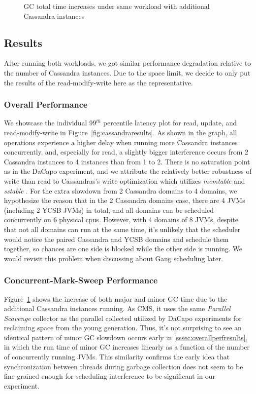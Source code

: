 \documentclass{sig-alternate}
\begin{document}
\begin{figure}
\centering
{}
\caption{GC total time increases under same workload with additional Cassandra instances}
\label{fig:cassandragc}
\end{figure}

\subsection{Results}
After running both workloads, we got similar performance degradation relative to the number of Cassandra instances. Due to the space limit, we decide to only put the results of the read-modify-write here as the representative.

\subsubsection{Overall Performance}
We showcase the individual 99$^{th}$ percentile latency plot for read, update, and read-modify-write in Figure~\ref{fig:cassandraresults}. As shown in the graph, all operations experience a higher delay when running more Cassandra instances concurrently, and, especially for read, a slightly bigger interference occurs from 2 Cassandra instances to 4 instances than from 1 to 2. There is no saturation point as in the DaCapo experiment, and we attribute the relatively better robustness of write than read to Cassandras's write optimization which utilizes \textit{memtable} and \textit{sstable} \cite{lakshman2010cassandra}. For the extra slowdown from 2 Cassandra domains to 4 domains, we hypothesize the reason that in the 2 Cassandra domains case, there are 4 JVMs (including 2 YCSB JVMs) in total, and all domains can be scheduled concurrently on 6 physical cpus. However, with 4 domains of 8 JVMs, despite that not all domains can run at the same time, it's unlikely that the scheduler would notice the paired Cassandra and YCSB domains and schedule them together, so chances are one side is blocked while the other side is running. We would revisit this problem when discussing about Gang scheduling later.

\subsubsection{Concurrent-Mark-Sweep Performance}
Figure~\ref{fig:cassandragc} shows the increase of both major and minor GC time due to the additional Cassandra instances running. As CMS, it uses the same \textit{Parallel Scavenge} collector as the parallel collected utilized by DaCapo experiments for reclaiming space from the young generation. Thus, it's not surprising to see an identical pattern of minor GC slowdown occurs early in \ref{sssec:overallperfresults}, in which the run time of minor GC increases linearly as a function of the number of concurrently running JVMs. This similarity confirms the early idea that synchronization between threads during garbage collection does not seem to be fine grained enough for scheduling interference to be significant in our experiment.
\end{document}

